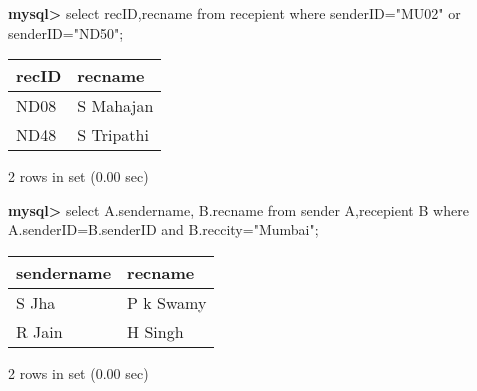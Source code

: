 \documentclass[11pt]{article}
\begin{document}
\textbf{mysql>} select recID,recname from recepient where senderID="MU02" or senderID="ND50";
\begin{center}
\begin{tabular}{|l|l|}
\hline
recID & recname \\
\hline
ND08 & S Mahajan \\
ND48 & S Tripathi \\
\hline
\end{tabular}
\end{center}
2 rows in set (0.00 sec)

\textbf{mysql>} select A.sendername, B.recname from sender A,recepient B where A.senderID=B.senderID and B.reccity="Mumbai";
\begin{center}
\begin{tabular}{|l|l|}
\hline
sendername & recname \\
\hline
S Jha & P k Swamy \\
R Jain & H Singh \\
\hline
\end{tabular}
\end{center}
2 rows in set (0.00 sec)
\end{document}
